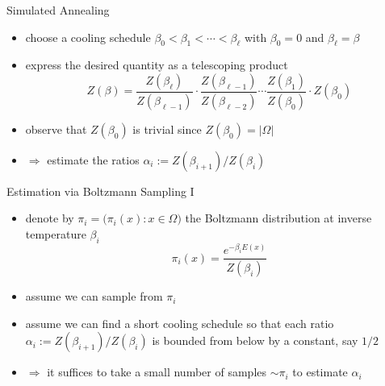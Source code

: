 \documentclass[slideColor]{prosper}
\renewcommand{\>}{\rangle}
\newcommand{\<}{\langle}
\begin{document}

\begin{slide}{Simulated Annealing}
\begin{itemize}
\item choose a cooling schedule $\beta_0 < \beta_1 < \cdots < \beta_{\ell}$ with $\beta_0=0$ and $\beta_{\ell}=\beta$

\medskip
\item express the desired quantity as a telescoping product
\[
Z(\beta) = \frac{Z(\beta_{\ell})}{Z(\beta_{\ell-1})} \cdot \frac{Z(\beta_{\ell-1})}{Z(\beta_{\ell-2})} \cdots \frac{Z(\beta_1)}{Z(\beta_0)} \cdot Z(\beta_0) 
\]

\medskip
\item observe that $Z(\beta_0)$ is trivial since $Z(\beta_0)=|\Omega|$

\medskip
\item $\Rightarrow$ estimate the ratios $\alpha_i:=Z(\beta_{i+1})/Z(\beta_i)$ 
\end{itemize}
\end{slide}


\begin{slide}{Estimation via Boltzmann Sampling I}
\begin{itemize}
\item denote by $\pi_i=\big(\pi_i(x) : x\in\Omega\big)$ the Boltzmann distribution at inverse temperature $\beta_i$
\[
\pi_i(x) = \frac{e^{-\beta_i E(x)}}{Z(\beta_i)}
\]

\item assume we can sample from $\pi_i$

\medskip
\item assume we can find a short cooling schedule so that each ratio $\alpha_i:=Z(\beta_{i+1})/Z(\beta_i)$ is bounded from below by a constant, say $1/2$

\medskip
\item $\Rightarrow$ it suffices to take a small number of samples $\sim \pi_i$ to estimate $\alpha_i$

\end{itemize}
\end{slide}

\end{document}
